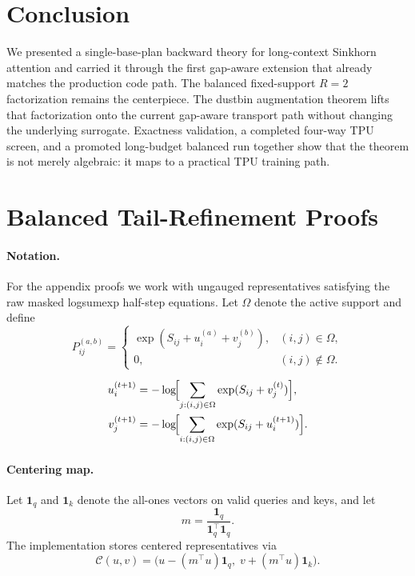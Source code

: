 \section{Conclusion}

We presented a single-base-plan backward theory for long-context Sinkhorn attention and carried it through the first gap-aware extension that already matches the production code path. The balanced fixed-support $R=2$ factorization remains the centerpiece. The dustbin augmentation theorem lifts that factorization onto the current gap-aware transport path without changing the underlying surrogate. Exactness validation, a completed four-way TPU screen, and a promoted long-budget balanced run together show that the theorem is not merely algebraic: it maps to a practical TPU training path.




\newpage
\appendix

\section{Balanced Tail-Refinement Proofs}
\label{app:proofs}

\paragraph{Notation.}
For the appendix proofs we work with ungauged representatives satisfying the raw masked logsumexp half-step equations. Let $\Omega$ denote the active support and define
\[
P^{(a,b)}_{ij} =
\begin{cases}
\exp(S_{ij}+u_i^{(a)}+v_j^{(b)}), & (i,j)\in\Omega, \\
0, & (i,j)\notin\Omega.
\end{cases}
\]

\begin{align}
    u_i^{(t+1)} &= -\log\!\Bigl[\sum_{j:(i,j)\in\Omega} \exp(S_{ij} + v_j^{(t)})\Bigr], \label{eq:u_update_app_unified}\\
    v_j^{(t+1)} &= -\log\!\Bigl[\sum_{i:(i,j)\in\Omega} \exp(S_{ij} + u_i^{(t+1)})\Bigr]. \label{eq:v_update_app_unified}
\end{align}

\paragraph{Centering map.}
Let $\mathbf{1}_q$ and $\mathbf{1}_k$ denote the all-ones vectors on valid queries and keys, and let
\[
m = \frac{\mathbf{1}_q}{\mathbf{1}_q^\top\mathbf{1}_q}.
\]
The implementation stores centered representatives via
\[
\mathcal{C}(u,v)=\bigl(u-(m^\top u)\mathbf{1}_q,\; v+(m^\top u)\mathbf{1}_k\bigr).
\]

